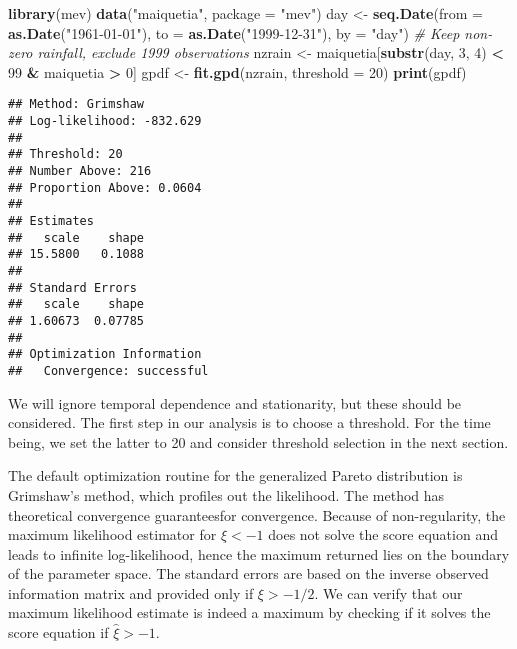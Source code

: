 \documentclass[]{book}
\newenvironment{Shaded}{\begin{snugshade}}{\end{snugshade}}
\newcommand{\CommentTok}[1]{\textcolor[rgb]{0.56,0.35,0.01}{\textit{#1}}}
\newcommand{\DataTypeTok}[1]{\textcolor[rgb]{0.13,0.29,0.53}{#1}}
\newcommand{\DecValTok}[1]{\textcolor[rgb]{0.00,0.00,0.81}{#1}}
\newcommand{\KeywordTok}[1]{\textcolor[rgb]{0.13,0.29,0.53}{\textbf{#1}}}
\newcommand{\NormalTok}[1]{#1}
\newcommand{\OperatorTok}[1]{\textcolor[rgb]{0.81,0.36,0.00}{\textbf{#1}}}
\newcommand{\StringTok}[1]{\textcolor[rgb]{0.31,0.60,0.02}{#1}}
\begin{document}
\begin{Shaded}
\begin{Highlighting}[]
\KeywordTok{library}\NormalTok{(mev)}
\KeywordTok{data}\NormalTok{(}\StringTok{"maiquetia"}\NormalTok{, }\DataTypeTok{package =} \StringTok{"mev"}\NormalTok{)}
\NormalTok{day <-}\StringTok{ }\KeywordTok{seq.Date}\NormalTok{(}\DataTypeTok{from =} \KeywordTok{as.Date}\NormalTok{(}\StringTok{"1961-01-01"}\NormalTok{), }
                \DataTypeTok{to =} \KeywordTok{as.Date}\NormalTok{(}\StringTok{"1999-12-31"}\NormalTok{), }\DataTypeTok{by =} \StringTok{"day"}\NormalTok{)}
\CommentTok{# Keep non-zero rainfall, exclude 1999 observations}
\NormalTok{nzrain <-}\StringTok{ }\NormalTok{maiquetia[}\KeywordTok{substr}\NormalTok{(day, }\DecValTok{3}\NormalTok{, }\DecValTok{4}\NormalTok{) }\OperatorTok{<}\StringTok{ }\DecValTok{99} \OperatorTok{&}\StringTok{ }\NormalTok{maiquetia }\OperatorTok{>}\StringTok{ }\DecValTok{0}\NormalTok{]}
\NormalTok{gpdf <-}\StringTok{ }\KeywordTok{fit.gpd}\NormalTok{(nzrain, }\DataTypeTok{threshold =} \DecValTok{20}\NormalTok{)}
\KeywordTok{print}\NormalTok{(gpdf)}
\end{Highlighting}
\end{Shaded}

\begin{verbatim}
## Method: Grimshaw 
## Log-likelihood: -832.629 
## 
## Threshold: 20 
## Number Above: 216 
## Proportion Above: 0.0604 
## 
## Estimates
##   scale    shape  
## 15.5800   0.1088  
## 
## Standard Errors
##   scale    shape  
## 1.60673  0.07785  
## 
## Optimization Information
##   Convergence: successful
\end{verbatim}

We will ignore temporal dependence and stationarity, but these should be considered.
The first step in our analysis is to choose a threshold. For the time being, we set the latter to 20 and consider threshold selection in the next section.

The default optimization routine for the generalized Pareto distribution is
Grimshaw's method, which profiles out the likelihood. The method has theoretical convergence guaranteesfor convergence. Because of non-regularity, the maximum likelihood estimator for \(\xi < -1\) does not solve the score equation and leads to infinite log-likelihood, hence the maximum returned lies on the boundary of the parameter space. The standard errors are based on the inverse observed information matrix and provided only if \(\xi>-1/2\). We can verify that our maximum likelihood estimate is indeed a maximum by checking if it solves the score equation if \(\hat{\xi}>-1\).
\end{document}

